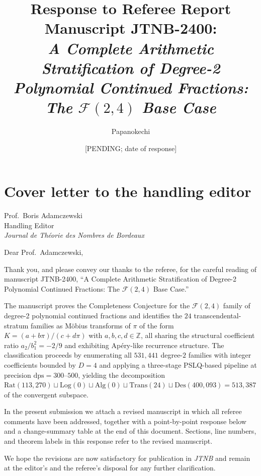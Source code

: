 \documentclass[11pt]{amsart}
\title[Response to Referee --- JTNB-2400]{Response to Referee Report\\
\textnormal{\small Manuscript JTNB-2400:\\
\emph{A Complete Arithmetic Stratification of Degree-2 Polynomial
Continued Fractions: The $\mathcal{F}(2,4)$ Base Case}}}
\author{Papanokechi}
\date{[PENDING; date of response]}
\begin{document}
\maketitle

\section*{Cover letter to the handling editor}

\noindent
Prof.\ Boris Adamczewski\\
Handling Editor\\
\emph{Journal de Th\'eorie des Nombres de Bordeaux}

\bigskip

\noindent
Dear Prof.\ Adamczewski,

\medskip

Thank you, and please convey our thanks to the referee, for the
careful reading of manuscript JTNB-2400, ``A Complete Arithmetic
Stratification of Degree-2 Polynomial Continued Fractions: The
$\mathcal{F}(2,4)$ Base Case.''

The manuscript proves the Completeness Conjecture for the
$\mathcal{F}(2,4)$ family of degree-2 polynomial continued fractions
and identifies the $24$ transcendental-stratum families as
M\"obius transforms of $\pi$ of the form $K = (a + b\pi)/(c + d\pi)$
with $a,b,c,d\in\mathbb{Z}$, all sharing the structural coefficient
ratio $a_{2}/b_{1}^{2} = -2/9$ and exhibiting Ap\'ery-like recurrence
structure.  The classification proceeds by enumerating all $531{,}441$
degree-$2$ families with integer coefficients bounded by $D = 4$ and
applying a three-stage PSLQ-based pipeline at precision
$\mathrm{dps} = 300$--$500$, yielding the decomposition
\(
  \mathrm{Rat}(113{,}270)\sqcup\mathrm{Log}(0)\sqcup\mathrm{Alg}(0)
  \sqcup\mathrm{Trans}(24)\sqcup\mathrm{Des}(400{,}093)
  = 513{,}387
\)
of the convergent subspace.

In the present submission we attach a revised manuscript in which
all referee comments have been addressed, together with a
point-by-point response below and a change-summary table at the end
of this document.  Sections, line numbers, and theorem labels in this
response refer to the revised manuscript.

We hope the revisions are now satisfactory for publication in
\emph{JTNB} and remain at the editor's and the referee's disposal
for any further clarification.
\end{document}
